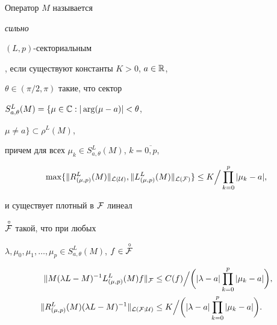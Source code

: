\begin{defn}


Оператор $M$ называется {\it сильно


$(L,p)$-секториальным}, если существуют константы $K>0$, $a\in {\Bbb R}$,


$\theta\in ( \pi /2, \pi )$ такие, что сектор 


$S_{a,\theta }^L(M)=\{\mu\in {\Bbb C}:|\arg (\mu -a)|<\theta$,


$\mu\ne a\}\subset\rho^L(M)$, 


причем для всех $ \mu _k\in S_{a,\theta}^L(M)$, $k=\overline{0,p}$, 


$$


\max\{\|R_{(\mu ,p)}^L(M)\|_{\cal L(\cal U)},\| L_{(\mu


,p)}^L(M)\|_{\cal L(\cal F)}\}\le K\Big/\prod\limits


_{k=0}^p|\mu _k-a|,


$$


и существует плотный в ${\cal F}$ линеал


$\overset{\,\circ}{\cal F}$ такой, что при любых


$\lambda ,\mu _0,\mu _1,\dotsc,\mu _p\in


S_{a,\theta }^L(M)$, $f\in\overset{\,\circ}{\cal F}$


\begin{align*}


\|M(\lambda L-M)^{-1}L_{(\mu ,p)}^L(M)f\| _{{\cal F}}&\le


C(f)\Big/\bigg(|\lambda-a |\prod\limits_{k=0}^p|\mu _k-a|\bigg),\\


%


\|R_{(\mu ,p)}^L(M)(\lambda L-M)^{-1}\|_{\cal L(\cal F;\cal U)}&\le


K\Big/\bigg(|\lambda-a |\prod\limits_{k=0}^p|\mu_k-a|\bigg).


\end{align*}


\end{defn}








